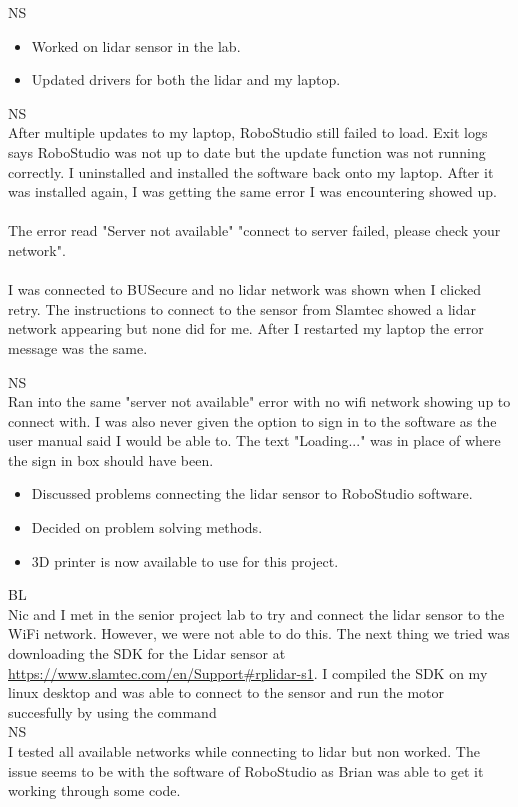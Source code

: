 \documentclass[fontsize=11pt, %
                             paper=a4, %
                             twoside, %
                             captions=tableheading,
                             index=totoc,
                             hyperref]{labbook}
\begin{document}
\begin{addmargin}[0cm]{0cm}
NS\\
\begin{itemize}
\item Worked on lidar sensor in the lab.
\item Updated drivers for both the lidar and my laptop.
\end{itemize}


NS\\
After multiple updates to my laptop, RoboStudio still failed to load. Exit logs says RoboStudio was not up to date but the update function was not running correctly. I uninstalled and installed the software back onto my laptop. After it was installed again, I was getting the same error I was encountering showed up.\\
\\
The error read "Server not available" "connect to server failed, please check your network".\\ 
\\
I was connected to BUSecure and no lidar network was shown when I clicked retry. The instructions to connect to the sensor from Slamtec showed a lidar network appearing but none did for me. After I restarted my laptop the error message was the same.


NS\\
Ran into the same "server not available" error with no wifi network showing up to connect with. I was also never given the option to sign in to the software as the user manual said I would be able to. The text "Loading..." was in place of where the sign in box should have been.


\begin{itemize}
\item Discussed problems connecting the lidar sensor to RoboStudio software.
\item Decided on problem solving methods.
\item 3D printer is now available to use for this project.
\end{itemize}

BL\\
Nic and I met in the senior project lab to try and connect the lidar sensor to the WiFi network. However, we were not able to do this. The next thing we tried was downloading the SDK for the Lidar sensor at \url{https://www.slamtec.com/en/Support#rplidar-s1}. I compiled the SDK on my linux desktop and was able to connect to the sensor and run the motor succesfully by using the command\\
NS\\
I tested all available networks while connecting to lidar but non worked. The issue seems to be with the software of RoboStudio as Brian was able to get it working through some code. 


\end{addmargin}
\end{document}
